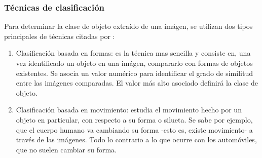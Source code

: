 \documentclass[a4paper,12pt,oneside,spanish]{book}
\begin{document}
\subsubsection{Técnicas de clasificación}
Para determinar la clase de objeto extraído de una imágen, se utilizan dos tipos principales de técnicas citadas por \cite{lozano}:
\begin{enumerate}
	\baselineskip 0pt
	\item Clasificación basada en formas: es la técnica mas sencilla y consiste en, una vez identificado un objeto en una imágen, compararlo con formas de objetos existentes. Se asocia un valor numérico para identificar el grado de similitud entre las imágenes comparadas. El valor más alto asociado definirá la clase de objeto.\\
	\item Clasificación basada en movimiento: estudia el movimiento hecho por un objeto en particular, con respecto a su forma o silueta. Se sabe por ejemplo, que el cuerpo humano va cambiando su forma -esto es, existe movimiento- a través de las imágenes. Todo lo contrario a lo que ocurre con los automóviles, que no suelen cambiar su forma.
	\\
\end{enumerate}	\baselineskip 14pt
\end{document}
